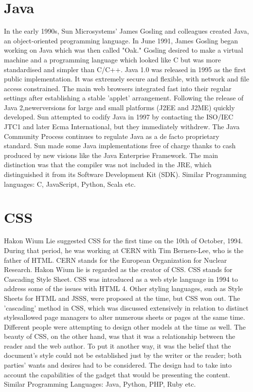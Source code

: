 \documentclass{article}
\begin{document}
    \section*{Java}
    In the early 1990s, Sun Microsystems' James Gosling and colleagues created Java, an  object-oriented programming language.
    In June 1991, James Gosling began working on Java which was then called "Oak." 
    Gosling desired to make a virtual machine and a programming language which looked like C but was more  standardised and simpler than C/C++. 
    Java 1.0 was released in 1995 as the first public implementation.
    It was extremely secure and flexible, with network and file access constrained.
    The main  web browsers integrated fast into their regular settings after establishing a stable 'applet' arrangement.
    Following the release of Java 2,newerversions for large and small platforms (J2EE and J2ME)  quickly developed.
    Sun attempted to codify Java in 1997 by contacting the ISO/IEC JTC1 and later Ecma  International, but they immediately withdrew. 
    The Java Community Process continues to regulate Java as a de facto proprietary         standard. 
    Sun made some Java implementations free of charge thanks to cash produced by new visions like the Java Enterprise Framework. 
    The main distinction was that the compiler was not included in the JRE, which              distinguished it from its Software Development Kit (SDK).
    Similar Programming languages: C, JavaScript, Python, Scala etc.
    \section*{CSS}
    Hakon Wium Lie suggested CSS for the first time on the 10th of October, 1994. 
    During that period, he was working at CERN with Tim Berners-Lee, who is the father of HTML. 
    CERN stands for the European Organization for Nuclear Research. 
    Hakon Wium lie is regarded as the creator  of CSS.
    CSS stands for Cascading Style Sheet.
    CSS was introduced as a web style language in 1994 to address some of the issues with HTML 4.
    Other styling languages, such as Style Sheets for HTML and JSSS, were proposed at the time, but CSS won out.
    The ’cascading' method in CSS, which was discussed extensively in relation to distinct stylesallowed page managers to alter numerous sheets or pages at the same time.
    Different people were attempting to design other models at the time as well.
    The beauty of CSS, on the other hand, was that it was a relationship between the reader and the web author. 
    To put it another way, it was the belief that the document's style could not be established just by the writer or the reader; both parties' wants and desires had to be considered. 
    The design had to take into account the capabilities of the gadget that would be presenting the content.
    Similar Programming Languages: Java, Python, PHP, Ruby etc.
\end{document}
